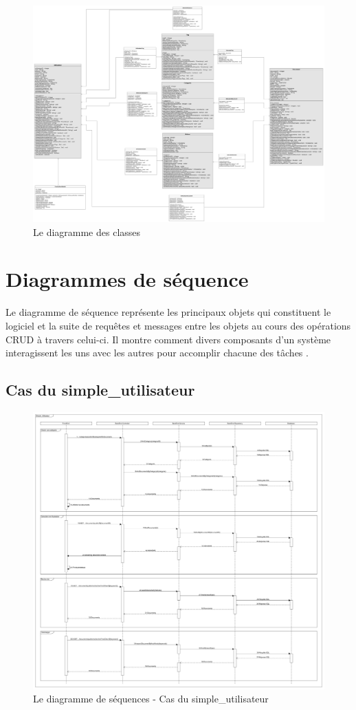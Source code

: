 		\begin{figure}[!ht]
			\centering
			\includegraphics[width=0.7\linewidth]{Pictures/DiagrammeDeClasses.jpg}
			\caption{Le diagramme des classes}
			\label{DiagremmeClasses}
		\end{figure}



	\section{Diagrammes de s\'equence}
		Le diagramme de s\'equence repr\'esente les principaux objets qui constituent le logiciel et la suite de requ\^etes et messages entre les objets au cours des op\'erations CRUD \`a travers celui-ci. Il montre comment divers composants d'un syst\`eme interagissent les uns avec les autres pour accomplir chacune des t\^aches \cite{DiagrammeSequence}. 
		
		\subsection{Cas du simple\_utilisateur}
			\begin{figure}[!ht]
				\centering
				\includegraphics[height=0.7\textheight]{Pictures/DiagrammeDeSequenceSimpleUtilisateur.jpg}
				\caption{Le diagramme de s\'equences - Cas du simple\_utilisateur}
				\label{DiagrammeDeSequenceSU}
			\end{figure}

